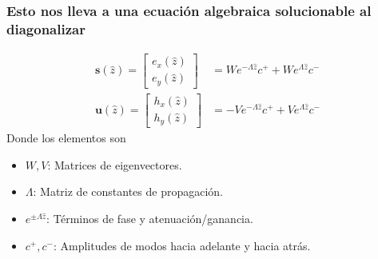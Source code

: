 \documentclass[english,9pt]{Linnaeus}
\begin{document}
\begin{frame}[allowframebreaks]
  \frametitle{Esto nos lleva a una ecuación algebraica solucionable al diagonalizar}
  \begin{align*}
    \mathbf{s}(\hat{z}) = \begin{bmatrix}e_x(\hat{z})\\ e_y(\hat{z})\end{bmatrix} &= W e^{-\Lambda \hat{z}}c^+ + We^{\Lambda \hat{z}} c^-\\
      \mathbf{u}(\hat{z}) = \begin{bmatrix}h_x(\hat{z})\\ h_y(\hat{z})\end{bmatrix} &= - V e^{-\Lambda \hat{z}}c^+ + Ve^{\Lambda \hat{z}} c^-
  \end{align*}
  Donde los elementos son\cite{lou_fan_2025}
  \begin{itemize}
    \item \textbf{$W, V$}: Matrices de eigenvectores.
    \item \textbf{$\Lambda$}: Matriz de constantes de propagación.
    \item \textbf{$e^{\pm \Lambda \hat{z}}$}: Términos de fase y atenuación/ganancia.
    \item \textbf{$c^+, c^-$}: Amplitudes de modos hacia adelante y hacia atrás.
  \end{itemize}
\end{frame}
\end{document}

